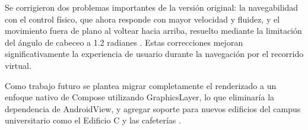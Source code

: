\documentclass[conference]{IEEEtran}
\begin{document}
Se corrigieron dos problemas importantes de la versión original: la navegabilidad con el control físico, que ahora responde con mayor velocidad y fluidez, y el movimiento fuera de plano al voltear hacia arriba, resuelto mediante la limitación del ángulo de cabeceo a 1.2 radianes \cite{android_sensors}. Estas correcciones mejoran significativamente la experiencia de usuario durante la navegación por el recorrido virtual.

Como trabajo futuro se plantea migrar completamente el renderizado a un enfoque nativo de Compose utilizando GraphicsLayer, lo que eliminaría la dependencia de AndroidView, y agregar soporte para nuevos edificios del campus universitario como el Edificio C y las cafeterías \cite{horton2021,phillips2022}.

\printbibliography
\end{document}
